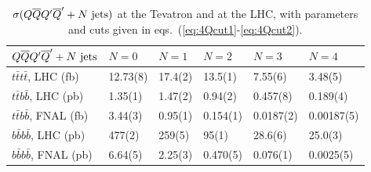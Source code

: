 \documentclass[paper]{JHEP3}
\newcommand{\ccaption}[2]{
    \begin{center}
    \parbox{0.85\textwidth}{
      \caption[#1]{\small{{#2}}}
      }
    \end{center}
    }
\def    \bbar   {\bar{b}}
\def    \tbar   {\bar{t}}
\def    \Qbar   {\overline{Q}}
\begin{document}
{\renewcommand{\arraystretch}{1.2}
\begin{table}
\begin{center}
\begin{tabular}{||l|l|l|l|l|l||}\hline
$Q \Qbar Q' \Qbar' + N~{\rm jets}$  & $N = 0$  & 
$N = 1$ & $N = 2$ & $N = 3$ & $N = 4$\\ 
\hline
$t \tbar t \tbar$, LHC (fb) &  12.73(8) & 17.4(2) & 13.5(1) & 7.55(6) 
& 3.48(5)\\ 
\hline
$t \tbar b \bbar$, LHC (pb)   &  1.35(1) & 1.47(2) &  
0.94(2) & 0.457(8) & 0.189(4)\\ 
\hline
$t \tbar b \bbar$, FNAL (fb)  & 3.44(3) & 0.95(1) & 0.154(1) & 
0.0187(2) & 0.00187(5) \\ 
\hline
$b \bbar b \bbar$, LHC (pb) & 477(2)  & 259(5) & 95(1) & 28.6(6) &
25.0(3) \\ 
\hline
$b \bbar b \bbar$, FNAL (pb) & 6.64(5) & 2.25(3) & 0.470(5) & 0.076(1) 
& 0.0025(5) \\ 
\hline
\end{tabular}            
\ccaption{}{\label{tab:4Qxs} $\sigma(Q \Qbar Q' \Qbar' + N~{\rm jets})$
at the Tevatron and 
at the LHC, with parameters and cuts given in
eqs.~(\ref{eq:4Qcut1}-\ref{eq:4Qcut2}).}
\end{center}
\end{table}}
\end{document}
